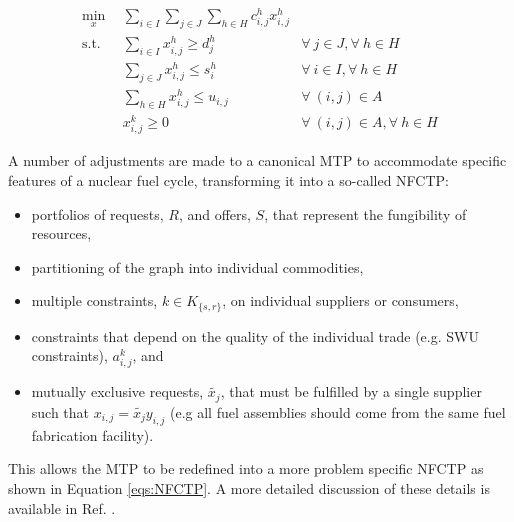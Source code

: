 \begin{subequations}\label{eqs:MCTP}
  \begin{align}
    \min_{x} \:\: & 
    \sum_{i \in I}\sum_{j \in J}\sum_{h \in H} c_{i,j}^{h} x_{i,j}^{h}
    & \label{eqs:MCTP_obj} \\
    \text{s.t.} \:\: 
    &
    \sum_{i \in I} x_{i,j}^{h} \geq d_{j}^{h}
    & 
    \forall \: j \in J, \forall \: h \in H \label{eqs:MCTP_dem} \\
    &
    \sum_{j \in J} x_{i,j}^{h} \leq s_{i}^{h}
    &
    \forall \: i \in I, \forall \: h \in H \label{eqs:MCTP_sup} \\
    &
    \sum_{h \in H} x_{i,j}^{h} \leq u_{i,j}
    & 
    \forall \: (i, j) \in A \label{eqs:MCTP_cap} \\
    &
    x_{i,j}^{k} \geq 0
    &
    \forall \: (i, j) \in A, \forall \: h \in H \label{eqs:MCTP_x}
  \end{align}
\end{subequations}


A number of adjustments are made to a canonical MTP to accommodate specific
features of a nuclear fuel cycle, transforming it into a so-called
\gls{NFCTP}:

\begin{itemize}
\item portfolios of requests, $R$, and offers, $S$, that represent the
  fungibility of resources,
\item partitioning of the graph into individual commodities,
\item multiple constraints, $k \in K_{\{s,r\}}$, on individual suppliers or consumers,
\item constraints that depend on the quality of the individual trade (e.g. SWU
  constraints), $a_{i,j}^k$, and
\item mutually exclusive requests, $\tilde{x_j}$, that must be fulfilled by a
  single supplier such that $x_{i,j} = \tilde{x_j} y_{i,j}$ (e.g all fuel
  assemblies should come from the same fuel fabrication facility).
\end{itemize}
This allows the \gls{MTP} to be redefined into a more problem specific
\gls{NFCTP} as shown in Equation \ref{eqs:NFCTP}.  A more detailed discussion
of these details is available in Ref. .

